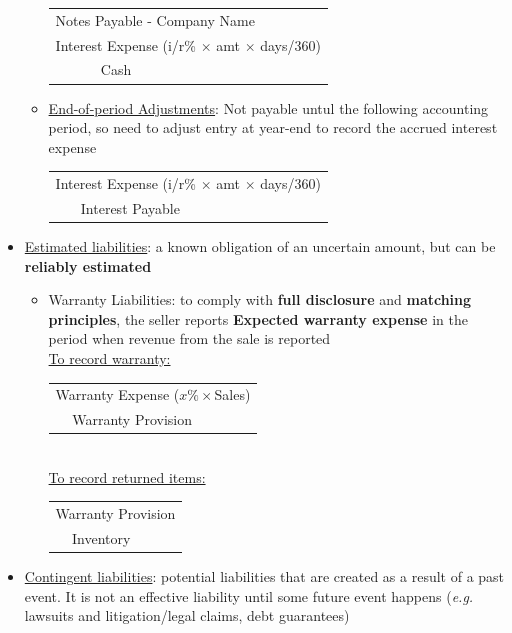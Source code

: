 \documentclass{article}
\newcommand{\eg}[0]{\textit{e.g. }}
\begin{document}
\begin{multicols}{2}
\begin{itemize}
\begin{itemize}
    \begin{tabular}{llll}
    	\multicolumn{4}{l}{Notes Payable - Company Name}\\
    	\multicolumn{4}{l}{Interest Expense (i/r\% $\times$ amt $\times$ days/360)}\\
    	& Cash& &
    \end{tabular}\vspace{0.5em}
\item \underline{End-of-period Adjustments}: Not payable untul the following accounting period, so need to adjust entry at year-end to record the accrued interest expense\vspace{0.5em}\\
\begin{tabular}{llll}
	\multicolumn{4}{l}{Interest Expense (i/r\% $\times$ amt $\times$ days/360)}\\
	& Interest Payable& &
\end{tabular}\vspace{0.5em}
    \end{itemize}
\item \underline{Estimated liabilities}: a known obligation of an uncertain amount, but can be \textbf{reliably estimated}
\begin{itemize}
	\item Warranty Liabilities: to comply with \textbf{full disclosure} and \textbf{matching principles}, the seller reports \textbf{Expected warranty expense} in the period when revenue from the sale is reported\\
	\underline{To record warranty:}\vspace{0.5em}\\
	\begin{tabular}{llll}
		\multicolumn{4}{l}{Warranty Expense ($x\% \times $Sales)}\\
		& Warranty Provision& &
	\end{tabular}\vspace{0.5em}\\
\underline{To record returned items:}\vspace{0.5em}\\
\begin{tabular}{llll}
	\multicolumn{4}{l}{Warranty Provision}\\
	& Inventory& &
\end{tabular}\vspace{0.5em}
\end{itemize}
\item \underline{Contingent liabilities}: potential liabilities that are created as a result of a past event. It is not an effective liability until some future event happens (\eg lawsuits and litigation/legal claims, debt guarantees)


\end{itemize}
\end{multicols}
\end{document}
